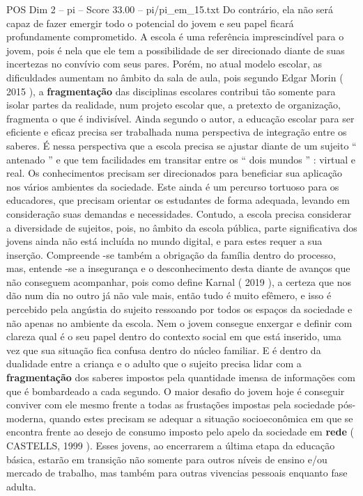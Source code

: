 \begin{textsample}{POS Dim 2 – pi – Score 33.00 – pi/pi\_em\_15.txt}
Do contrário, ela não será capaz de fazer emergir todo o potencial do jovem e seu papel ficará profundamente comprometido.
A escola é uma referência imprescindível para o jovem, pois é nela que ele tem a possibilidade de ser direcionado diante de suas incertezas no convívio com seus pares.
Porém, no atual modelo escolar, as dificuldades aumentam no âmbito da sala de aula, pois segundo Edgar Morin ( 2015 ), a \textbf{fragmentação} das disciplinas escolares contribui tão somente para isolar partes da realidade, num projeto escolar que, a pretexto de organização, fragmenta o que é indivisível.
Ainda segundo o autor, a educação escolar para ser eficiente e eficaz precisa ser trabalhada numa perspectiva de integração entre os saberes.
É nessa perspectiva que a escola precisa se ajustar diante de um sujeito “ antenado ” e que tem facilidades em transitar entre os “ dois mundos ” : virtual e real.
Os conhecimentos precisam ser direcionados para beneficiar sua aplicação nos vários ambientes da sociedade.
Este ainda é um percurso tortuoso para os educadores, que precisam orientar os estudantes de forma adequada, levando em consideração suas demandas e necessidades.
Contudo, a escola precisa considerar a diversidade de sujeitos, pois, no âmbito da escola pública, parte significativa dos jovens ainda não está incluída no mundo digital, e para estes requer a sua inserção.
Compreende -se também a obrigação da família dentro do processo, mas, entende -se a insegurança e o desconhecimento desta diante de avanços que não conseguem acompanhar, pois como define Karnal ( 2019 ), a certeza que nos dão num dia no outro já não vale mais, então tudo é muito efêmero, e isso é percebido pela angústia do sujeito ressoando por todos os espaços da sociedade e não apenas no ambiente da escola.
Nem o jovem consegue enxergar e definir com clareza qual é o seu papel dentro do contexto social em que está inserido, uma vez que sua situação fica confusa dentro do núcleo familiar.
E é dentro da dualidade entre a criança e o adulto que o sujeito precisa lidar com a \textbf{fragmentação} dos saberes impostos pela quantidade imensa de informações com que é bombardeado a cada segundo.
O maior desafio do jovem hoje é conseguir conviver com ele mesmo frente a todas as frustações impostas pela sociedade pós-moderna, quando estes precisam se adequar a situação socioeconômica em que se encontra frente ao desejo de consumo imposto pelo apelo da sociedade em \textbf{rede} ( CASTELLS, 1999 ).
Esses jovens, ao encerrarem a última etapa da educação básica, estarão em transição não somente para outros níveis de ensino e/ou mercado de trabalho, mas também para outras vivencias pessoais enquanto fase adulta.

\end{textsample}
